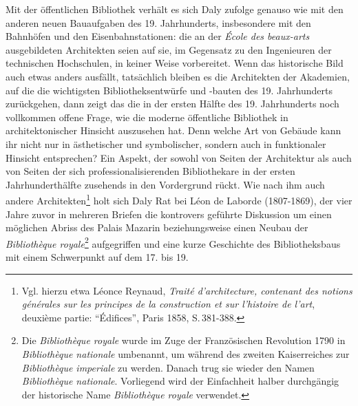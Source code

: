 Mit der öffentlichen Bibliothek verhält es sich Daly zufolge genauso wie
mit den anderen neuen Bauaufgaben des 19. Jahrhunderts, insbesondere mit
den Bahnhöfen und den Eisenbahnstationen: die an der \emph{École des
beaux-arts} ausgebildeten Architekten seien auf sie, im Gegensatz zu den
Ingenieuren der technischen Hochschulen, in keiner Weise vorbereitet.
Wenn das historische Bild auch etwas anders ausfällt, tatsächlich
bleiben es die Architekten der Akademien, auf die die wichtigsten
Bibliotheksentwürfe und -bauten des 19. Jahrhunderts zurückgehen, dann
zeigt das die in der ersten Hälfte des 19. Jahrhunderts noch vollkommen
offene Frage, wie die moderne öffentliche Bibliothek in
architektonischer Hinsicht auszusehen hat. Denn welche Art von Gebäude
kann ihr nicht nur in ästhetischer und symbolischer, sondern auch in
funktionaler Hinsicht entsprechen? Ein Aspekt, der sowohl von Seiten der
Architektur als auch von Seiten der sich professionalisierenden
Bibliothekare in der ersten Jahrhunderthälfte zusehends in den
Vordergrund rückt. Wie nach ihm auch andere Architekten\footnote{Vgl.
  hierzu etwa Léonce Reynaud, \emph{Traité d'architecture, contenant des
  notions générales sur les principes de la construction et sur
  l'histoire de l'art}, deuxième partie: \enquote{Édifices}, Paris 1858,
  S.\,381-388.} holt sich Daly Rat bei Léon de Laborde (1807-1869), der
vier Jahre zuvor in mehreren Briefen die kontrovers geführte Diskussion
um einen möglichen Abriss des Palais Mazarin beziehungsweise einen
Neubau der \emph{Bibliothèque royale}\footnote{Die \emph{Bibliothèque
  royale} wurde im Zuge der Französischen Revolution 1790 in
  \emph{Bibliothèque nationale} umbenannt, um während des zweiten
  Kaiserreiches zur \emph{Bibliothèque imperiale} zu werden. Danach trug
  sie wieder den Namen \emph{Bibliothèque nationale}. Vorliegend wird
  der Einfachheit halber durchgängig der historische Name
  \emph{Bibliothèque royale} verwendet.} aufgegriffen und eine kurze
Geschichte des Bibliotheksbaus mit einem Schwerpunkt auf dem 17. bis 19.

